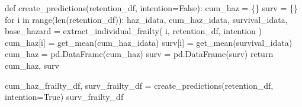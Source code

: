 \documentclass[
  letterpaper,
  DIV=11,
  numbers=noendperiod]{scrartcl}
\newenvironment{Shaded}{\begin{snugshade}}{\end{snugshade}}
\newcommand{\BuiltInTok}[1]{\textcolor[rgb]{0.00,0.23,0.31}{#1}}
\newcommand{\ControlFlowTok}[1]{\textcolor[rgb]{0.00,0.23,0.31}{#1}}
\newcommand{\KeywordTok}[1]{\textcolor[rgb]{0.00,0.23,0.31}{#1}}
\newcommand{\NormalTok}[1]{\textcolor[rgb]{0.00,0.23,0.31}{#1}}
\newcommand{\OperatorTok}[1]{\textcolor[rgb]{0.37,0.37,0.37}{#1}}
\newcommand{\VariableTok}[1]{\textcolor[rgb]{0.07,0.07,0.07}{#1}}
\begin{document}
\begin{Shaded}
\begin{Highlighting}[]
\KeywordTok{def}\NormalTok{ create\_predictions(retention\_df, intention}\OperatorTok{=}\VariableTok{False}\NormalTok{):}
\NormalTok{    cum\_haz }\OperatorTok{=}\NormalTok{ \{\}}
\NormalTok{    surv }\OperatorTok{=}\NormalTok{ \{\}}
    \ControlFlowTok{for}\NormalTok{ i }\KeywordTok{in} \BuiltInTok{range}\NormalTok{(}\BuiltInTok{len}\NormalTok{(retention\_df)):}
\NormalTok{        haz\_idata, cum\_haz\_idata, survival\_idata, base\_hazard }\OperatorTok{=}\NormalTok{ extract\_individual\_frailty(}
\NormalTok{            i, retention\_df, intention}
\NormalTok{        )}
\NormalTok{        cum\_haz[i] }\OperatorTok{=}\NormalTok{ get\_mean(cum\_haz\_idata)}
\NormalTok{        surv[i] }\OperatorTok{=}\NormalTok{ get\_mean(survival\_idata)}
\NormalTok{    cum\_haz }\OperatorTok{=}\NormalTok{ pd.DataFrame(cum\_haz)}
\NormalTok{    surv }\OperatorTok{=}\NormalTok{ pd.DataFrame(surv)}
    \ControlFlowTok{return}\NormalTok{ cum\_haz, surv}


\NormalTok{cum\_haz\_frailty\_df, surv\_frailty\_df }\OperatorTok{=}\NormalTok{ create\_predictions(retention\_df, intention}\OperatorTok{=}\VariableTok{True}\NormalTok{)}
\NormalTok{surv\_frailty\_df}
\end{Highlighting}
\end{Shaded}
\end{document}
